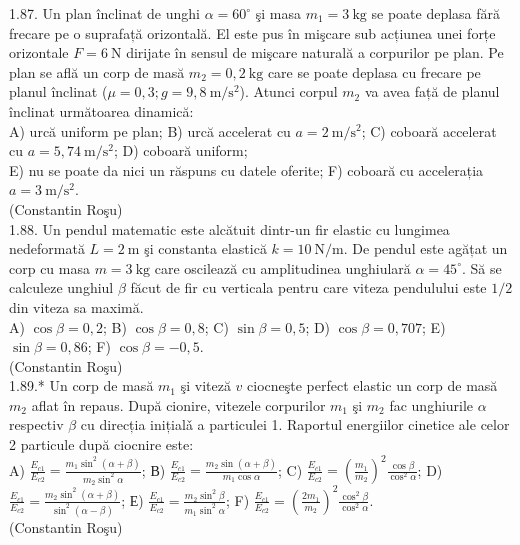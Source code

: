 \documentclass[10pt]{article}
\begin{document}
1.87. Un plan înclinat de unghi $\alpha=60^{\circ}$ şi masa $m_{1}=3 \mathrm{~kg}$ se poate deplasa fără frecare pe o suprafață orizontală. El este pus în mişcare sub acțiunea unei forțe orizontale $F=6 \mathrm{~N}$ dirijate în sensul de mişcare naturală a corpurilor pe plan. Pe plan se află un corp de masă $m_{2}=0,2 \mathrm{~kg}$ care se poate deplasa cu frecare pe planul înclinat ($\mu=0,3 ; g=9,8 \mathrm{~m} / \mathrm{s}^{2}$). Atunci corpul $m_{2}$ va avea față de planul înclinat următoarea dinamică:\\ A) urcă uniform pe plan; B) urcă accelerat cu $a=2 \mathrm{~m} / \mathrm{s}^{2}$; C) coboară accelerat cu $a=5,74 \mathrm{~m} / \mathrm{s}^{2}$; D) coboară uniform;\\ E) nu se poate da nici un răspuns cu datele oferite; F) coboară cu accelerația $a=3 \mathrm{~m} / \mathrm{s}^{2}$.\\ (Constantin Roşu)\\

1.88. Un pendul matematic este alcătuit dintr-un fir elastic cu lungimea nedeformată $L=2 \mathrm{~m}$ şi constanta elastică $k=10 \mathrm{~N} / \mathrm{m}$. De pendul este agățat un corp cu masa $m=3 \mathrm{~kg}$ care oscilează cu amplitudinea unghiulară $\alpha=45^{\circ}$. Să se calculeze unghiul $\beta$ făcut de fir cu verticala pentru care viteza pendulului este $1 / 2$ din viteza sa maximă.\\ A) $\cos \beta=0,2$; B) $\cos \beta=0,8$; C) $\sin \beta=0,5$; D) $\cos \beta=0,707$; E) $\sin \beta=0,86$; F) $\cos \beta=-0,5$.\\ (Constantin Roşu)\\

1.89.* Un corp de masă $m_{1}$ şi viteză $v$ ciocneşte perfect elastic un corp de masă $m_{2}$ aflat în repaus. După cionire, vitezele corpurilor $m_{1}$ şi $m_{2}$ fac unghiurile $\alpha$ respectiv $\beta$ cu direcția inițialǎ a particulei 1. Raportul energiilor cinetice ale celor 2 particule după ciocnire este:\\ A) $\frac{E_{c 1}}{E_{c 2}}=\frac{m_{1} \sin ^{2}(\alpha+\beta)}{m_{2} \sin ^{2} \alpha}$; В) $\frac{E_{c 1}}{E_{c 2}}=\frac{m_{2} \sin (\alpha+\beta)}{m_{1} \cos \alpha}$; C) $\frac{E_{c 1}}{E_{c 2}}=\left(\frac{m_{1}}{m_{2}}\right)^{2} \frac{\cos \beta}{\cos ^{2} \alpha}$; D) $\frac{E_{c 1}}{E_{c 2}}=\frac{m_{2} \sin ^{2}(\alpha+\beta)}{\sin ^{2}(\alpha-\beta)}$; Е) $\frac{E_{c 1}}{E_{c 2}}=\frac{m_{2} \sin ^{2} \beta}{m_{1} \sin ^{2} \alpha}$; F) $\frac{E_{c 1}}{E_{c 2}}=\left(\frac{2 m_{1}}{m_{2}}\right)^{2} \frac{\cos ^{2} \beta}{\cos ^{2} \alpha}$.\\ (Constantin Roşu)\\
\end{document}
